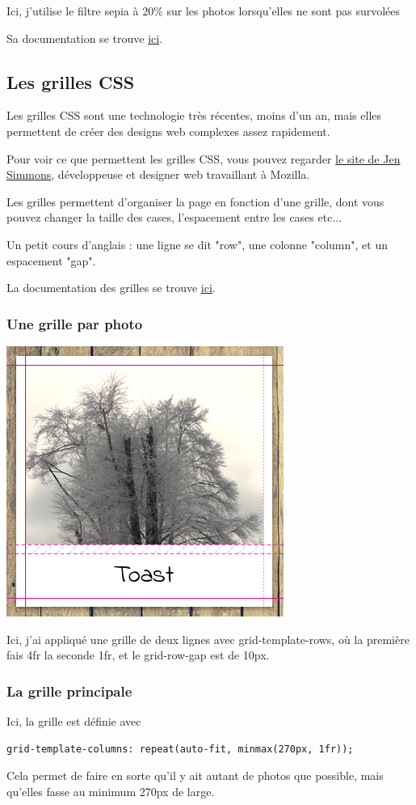 Ici, j'utilise le filtre sepia à 20\% sur les photos lorsqu'elles ne
sont pas survolées

Sa documentation se trouve \href{https://developer.mozilla.org/fr/docs/Web/CSS/filter#sepia()_2}{ici}.

\subsection{Les grilles CSS}
Les grilles CSS sont une technologie très récentes, moins d'un an, mais elles
permettent de créer des designs web complexes assez rapidement.

Pour voir ce que permettent les grilles CSS, vous pouvez regarder
\href{https://labs.jensimmons.com/}{le site de Jen Simmons}, développeuse et
designer web travaillant à Mozilla.

Les grilles permettent d'organiser la page en fonction d'une grille, dont vous
pouvez changer la taille des cases, l'espacement entre les cases etc...

Un petit cours d'anglais : une ligne se dit "row", une colonne "column", et un
espacement "gap".

La documentation des grilles se trouve \href{https://developer.mozilla.org/fr/docs/Web/CSS/CSS_Grid_Layout#CSS}{ici}.

\subsubsection{Une grille par photo}
\begin{center}\includegraphics[width=.5\linewidth]{img/grid_figure.png}\end{center}
Ici, j'ai appliqué une grille de deux lignes avec grid-template-rows, où la
première fais 4fr la seconde 1fr, et le grid-row-gap est de 10px.

\subsubsection{La grille principale}
Ici, la grille est définie avec
\begin{verbatim}
grid-template-columns: repeat(auto-fit, minmax(270px, 1fr));
\end{verbatim}
Cela permet de faire en sorte qu'il y ait autant de photos que possible, mais
qu'elles fasse au minimum 270px de large.


